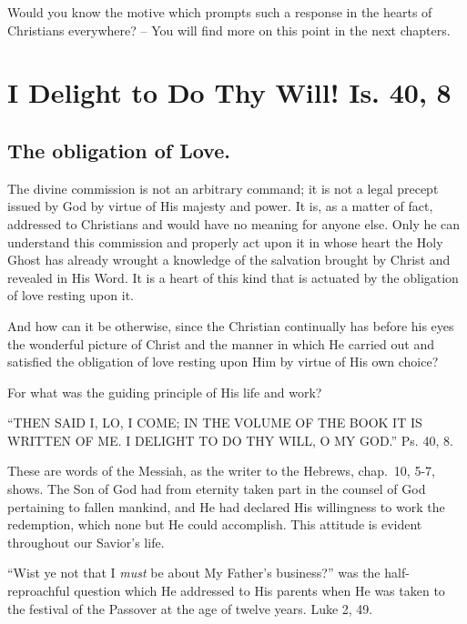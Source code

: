 \documentclass[
]{book}
\begin{document}
Would you know the motive which prompts such a response in the hearts of Christians everywhere? -- You will find more on this point in the next chapters.

\hypertarget{i-delight-to-do-thy-will-is.-40-8}{%
\chapter{I Delight to Do Thy Will! Is. 40, 8}\label{i-delight-to-do-thy-will-is.-40-8}}

\hypertarget{the-obligation-of-love.}{%
\section*{The obligation of Love.}\label{the-obligation-of-love.}}

The divine commission is not an arbitrary command; it is not a legal precept issued by God by virtue of His majesty and power. It is, as a matter of fact, addressed to Christians and would have no meaning for anyone else. Only he can understand this commission and properly act upon it in whose heart the Holy Ghost has already wrought a knowledge of the salvation brought by Christ and revealed in His Word. It is a heart of this kind that is actuated by the obligation of love resting upon it.

And how can it be otherwise, since the Christian continually has before his eyes the wonderful picture of Christ and the manner in which He carried out and satisfied the obligation of love resting upon Him by virtue of His own choice?

For what was the guiding principle of His life and work?

``THEN SAID I, LO, I COME; IN THE VOLUME OF THE BOOK IT IS WRITTEN OF ME. I DELIGHT TO DO THY WILL, O MY GOD.'' Ps. 40, 8.

These are words of the Messiah, as the writer to the Hebrews, chap.~10, 5-7, shows. The Son of God had from eternity taken part in the counsel of God pertaining to fallen mankind, and He had declared His willingness to work the redemption, which none but He could accomplish. This attitude is evident throughout our Savior's life.

``Wist ye not that I \emph{must} be about My Father's business?'' was the half-reproachful question which He addressed to His parents when He was taken to the festival of the Passover at the age of twelve years. Luke 2, 49.
\end{document}
